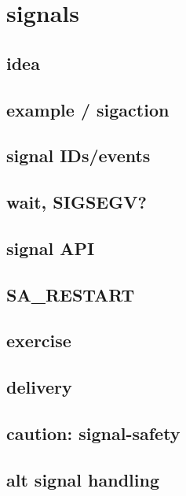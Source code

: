 \section{signals}

\subsection{idea}



\subsection{example / sigaction}



\subsection{signal IDs/events}




\subsection{wait, SIGSEGV?}



\subsection{signal API}



\subsection{SA\_RESTART}



\subsection{exercise}


\subsection{delivery}



\subsection{caution: signal-safety}



\subsection{alt signal handling}




